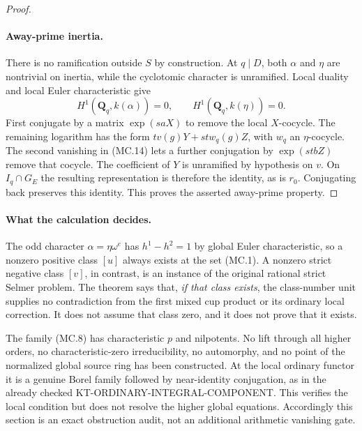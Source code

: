 \begin{proof}
\paragraph{Away-prime inertia.}
There is no ramification outside $S$ by construction.
At $q\mid D$, both $\alpha$ and $\eta$ are nontrivial on
inertia, while the cyclotomic character is unramified.
Local duality and local Euler characteristic give
\[
 H^1(\mathbf Q_q,k(\alpha))=0,
 \qquad H^1(\mathbf Q_q,k(\eta))=0.                     \tag{MC.14}
\]
First conjugate by a matrix $\exp(saX)$ to remove the local
$X$-cocycle.  The remaining logarithm has the form
$t v(g)Y+st w_q(g)Z$, with $w_q$ an $\eta$-cocycle.
The second vanishing in (MC.14) lets a further conjugation
by $\exp(stbZ)$ remove that cocycle.
The coefficient of $Y$ is unramified by hypothesis on $v$.
On $I_q\cap G_E$ the resulting representation is therefore
the identity, as is $r_0$.  Conjugating back preserves this
identity.  This proves the asserted away-prime property.
\end{proof}

\paragraph{What the calculation decides.}
The odd character $\alpha=\eta\omega^e$ has
$h^1-h^2=1$ by global Euler characteristic, so a nonzero
positive class $[u]$ always exists at the set (MC.1).
A nonzero strict negative class $[v]$, in contrast, is an
instance of the original rational strict Selmer problem.
The theorem says that, \emph{if that class exists}, the
class-number unit supplies no contradiction from the first
mixed cup product or its ordinary local correction.
It does not assume that class zero, and it does not prove
that it exists.

The family (MC.8) has characteristic $p$ and nilpotents.
No lift through all higher orders, no characteristic-zero
irreducibility, no automorphy, and no point of the normalized
global source ring has been constructed.  At the local
ordinary functor it is a genuine Borel family followed by
near-identity conjugation, as in the already checked
KT-ORDINARY-INTEGRAL-COMPONENT.  This verifies the local
condition but does not resolve the higher global equations.
Accordingly this section is an exact obstruction audit,
not an additional arithmetic vanishing gate.

